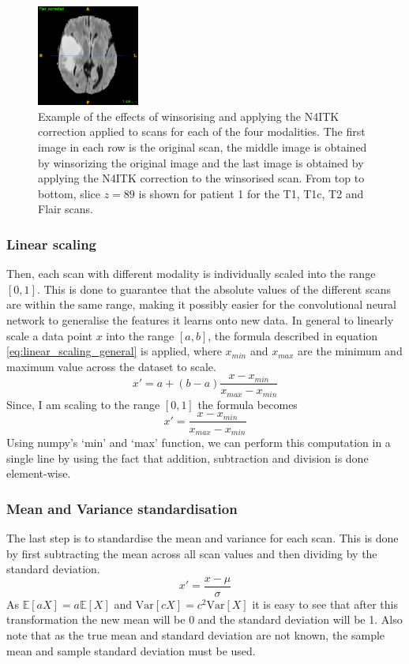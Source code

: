 \documentclass[12pt,a4paper,twoside,openright]{report}
\begin{document}
\begin{figure}
	\includegraphics[width=0.3\textwidth]{flair_n4itk_example}
	\caption{Example of the effects of winsorising and applying the N4ITK correction applied to scans for each of the four modalities. The first image in each row is the original scan, the middle image is obtained by winsorizing the original image and the last image is obtained by applying the N4ITK correction to the winsorised scan. From top to bottom, slice $z=89$ is shown for patient 1 for the T1, T1c, T2 and Flair scans.}
\end{figure}


\subsubsection{Linear scaling}
Then, each scan with different modality is individually scaled into the range $[0,1]$. This is done to guarantee that the absolute values of the different scans are within the same range, making it possibly easier for the convolutional neural network to generalise the features it learns onto new data. In general to linearly scale a data point $x$ into the range $[a, b]$, the formula described in equation \ref{eq:linear_scaling_general} is applied, where $x_{min}$ and $x_{max}$ are the minimum and maximum value across the dataset to scale.
\begin{equation}
	\label{eq:linear_scaling_general}
	x' = a + (b - a)\frac{x - x_{min}}{x_{max} - x_{min}}
\end{equation}
Since, I am scaling to the range $[0,1]$ the formula becomes
\begin{equation}
	x' = \frac{x - x_{min}}{x_{max} - x_{min}}
\end{equation}
Using numpy's `min' and `max' function, we can perform this computation in a single line by using the fact that addition, subtraction and division is done element-wise.

\subsubsection{Mean and Variance standardisation}
The last step is to standardise the mean and variance for each scan. This is done by first subtracting the mean across all scan values and then dividing by the standard deviation. 
\begin{equation}
	x' = \frac{x - \mu}{\sigma}
\end{equation}
As $\mathbb{E}[aX] = a \mathbb{E}[X]$ and $\textrm{Var} [cX] = c^2 \textrm{Var} [X]$ it is easy to see that after this transformation the new mean will be 0 and the standard deviation will be 1. Also note that as the true mean and standard deviation are not known, the sample mean and sample standard deviation must be used. 
\end{document}
